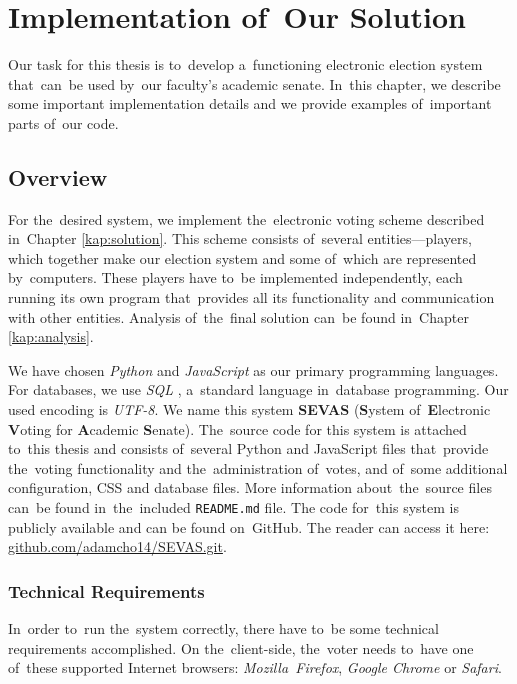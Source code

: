 \chapter{Implementation of~Our Solution}
\label{kap:implementation}
Our task for this thesis is to~develop a~functioning electronic election system that~can~be used by~our faculty's academic senate. In~this chapter, we describe some important implementation details and we provide examples of~important parts of~our code.

\section{Overview}
For the~desired system, we implement the~electronic voting scheme described in~Chapter \ref{kap:solution}. This scheme consists of~several entities—players, which together make our election system and some of~which are represented by~computers. These players have to~be implemented independently, each running its own program that~provides all its functionality and communication with other entities. Analysis of~the~final solution can~be found in~Chapter \ref{kap:analysis}.

We have chosen \emph{Python} \cite{Python} and \emph{JavaScript} \cite{JavaScript} as our primary programming languages. For databases, we use \emph{SQL} \cite{SQL}, a~standard language in~database programming. Our used encoding is \emph{UTF-8}.
\bigbreak
We name this system \textbf{SEVAS} (\textbf System of~\textbf Electronic \textbf Voting for \textbf Academic \textbf Senate). The~source code for this system is attached to~this thesis and consists of~several Python and JavaScript files that~provide the~voting functionality and the~administration of~votes, and of~some additional configuration, CSS and database files. More information about~the~source files can~be found in~the~included \texttt{README.md} file. The code for~this system is publicly available and can be found on~GitHub. The reader can access it here: \url{github.com/adamcho14/SEVAS.git}.

\subsection{Technical Requirements}
In~order to~run the~system correctly, there have to~be some technical requirements accomplished. On the~client-side, the~voter needs to~have one of~these supported Internet browsers: \emph{Mozilla~Firefox}, \emph{Google Chrome} or \emph{Safari}.

